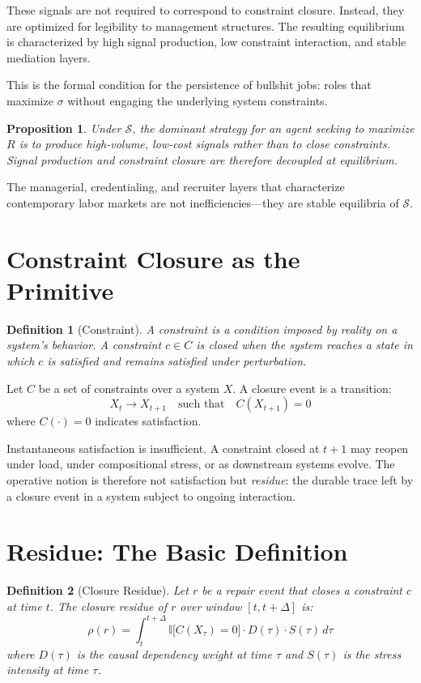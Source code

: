 \documentclass[12pt]{article}
\newtheorem{definition}{Definition}
\newtheorem{proposition}{Proposition}
\begin{document}
These signals are not required to correspond to constraint closure.
Instead, they are optimized for legibility to management structures.
The resulting equilibrium is characterized by high signal production,
low constraint interaction, and stable mediation layers.

This is the formal condition for the persistence of bullshit jobs: roles
that maximize $\sigma$ without engaging the underlying system
constraints.

\begin{proposition}
Under $\mathcal{S}$, the dominant strategy for an agent seeking to
maximize $R$ is to produce high-volume, low-cost signals rather than to
close constraints. Signal production and constraint closure are therefore
decoupled at equilibrium.
\end{proposition}

The managerial, credentialing, and recruiter layers that characterize
contemporary labor markets are not inefficiencies---they are stable
equilibria of $\mathcal{S}$.

\section{Constraint Closure as the Primitive}

\begin{definition}[Constraint]
A \emph{constraint} is a condition imposed by reality on a system's
behavior. A constraint $c \in C$ is \emph{closed} when the system
reaches a state in which $c$ is satisfied and remains satisfied under
perturbation.
\end{definition}

Let $C$ be a set of constraints over a system $X$. A closure event is a
transition:
\[
  X_t \rightarrow X_{t+1} \quad \text{such that} \quad C(X_{t+1}) = 0
\]
where $C(\cdot) = 0$ indicates satisfaction.

Instantaneous satisfaction is insufficient. A constraint closed at
$t+1$ may reopen under load, under compositional stress, or as
downstream systems evolve. The operative notion is therefore not
satisfaction but \emph{residue}: the durable trace left by a closure
event in a system subject to ongoing interaction.

\section{Residue: The Basic Definition}

\begin{definition}[Closure Residue]
Let $r$ be a repair event that closes a constraint $c$ at time $t$.
The \emph{closure residue} of $r$ over window $[t, t+\Delta]$ is:
\[
  \rho(r) = \int_{t}^{t+\Delta}
    \mathbb{I}\bigl[C(X_\tau) = 0\bigr]
    \cdot D(\tau)
    \cdot S(\tau)
  \, d\tau
\]
where $D(\tau)$ is the causal dependency weight at time $\tau$ and
$S(\tau)$ is the stress intensity at time $\tau$.
\end{definition}
\end{document}
